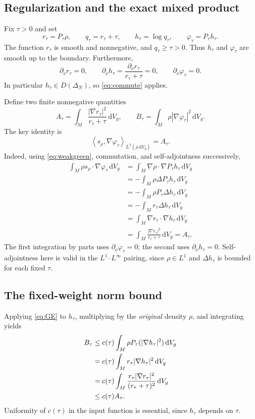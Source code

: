 \documentclass[11pt]{article}
\newcommand{\dd}{\,\mathrm{d}}
\newcommand{\dV}{\dd V_g}
\newcommand{\iprho}[2]{\left\langle #1,#2\right\rangle_{L^2(\rho\,\mathrm{d}V_g)}}
\begin{document}
\subsection{Regularization and the exact mixed product}
Fix $\tau>0$ and set
\[
 r_\tau=P_\tau\rho,\qquad q_\tau=r_\tau+\tau,
 \qquad h_\tau=\log q_\tau,\qquad \varphi_\tau=P_\tau h_\tau.
\]
The function $r_\tau$ is smooth and nonnegative, and $q_\tau\geq\tau>0$. Thus $h_\tau$ and $\varphi_\tau$ are smooth up to the boundary. Furthermore,
\[
 \partial_\nu r_\tau=0,
 \qquad \partial_\nu h_\tau=
 \frac{\partial_\nu r_\tau}{r_\tau+\tau}=0,
 \qquad \partial_\nu\varphi_\tau=0.
\]
In particular $h_\tau\in D(\Delta_N)$, so \eqref{eq:commute} applies.

Define two finite nonnegative quantities
\begin{equation}\label{eq:AB}
 A_\tau=\int_M\frac{|\nabla r_\tau|^2}{r_\tau+\tau}\dV,
 \qquad B_\tau=\int_M\rho|\nabla\varphi_\tau|^2\dV.
\end{equation}
The key identity is
\begin{equation}\label{eq:mixed}
 \iprho{s_\rho}{\nabla\varphi_\tau}=A_\tau.
\end{equation}
Indeed, using \eqref{eq:weakgreen}, commutation, and self-adjointness successively,
\begin{align*}
 \int_M\rho s_\rho\cdot\nabla\varphi_\tau\dV
 &=\int_M\nabla\rho\cdot\nabla P_\tau h_\tau\dV\\
 &=-\int_M\rho\Delta P_\tau h_\tau\dV\\
 &=-\int_M\rho P_\tau\Delta h_\tau\dV\\
 &=-\int_M r_\tau\Delta h_\tau\dV\\
 &=\int_M\nabla r_\tau\cdot\nabla h_\tau\dV\\
 &=\int_M\frac{|\nabla r_\tau|^2}{r_\tau+\tau}\dV=A_\tau.
\end{align*}
The first integration by parts uses $\partial_\nu\varphi_\tau=0$; the second uses $\partial_\nu h_\tau=0$. Self-adjointness here is valid in the $L^1$--$L^\infty$ pairing, since $\rho\in L^1$ and $\Delta h_\tau$ is bounded for each fixed $\tau$.

\subsection{The fixed-weight norm bound}
Applying \eqref{eq:GE} to $h_\tau$, multiplying by the \emph{original} density $\rho$, and integrating yields
\begin{align}
 B_\tau
 &\leq c(\tau)\int_M\rho P_\tau(|\nabla h_\tau|^2)\dV\notag\\
 &=c(\tau)\int_M r_\tau|\nabla h_\tau|^2\dV\notag\\
 &=c(\tau)\int_M\frac{r_\tau|\nabla r_\tau|^2}{(r_\tau+\tau)^2}\dV\notag\\
 &\leq c(\tau)A_\tau.\label{eq:Bbound}
\end{align}
Uniformity of $c(\tau)$ in the input function is essential, since $h_\tau$ depends on $\tau$.
\end{document}
